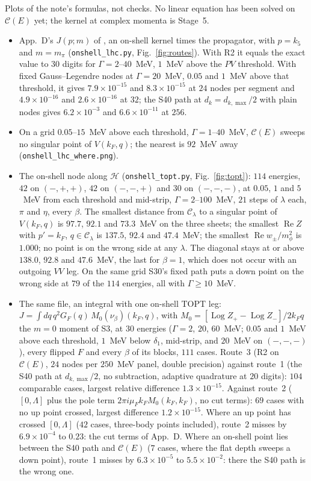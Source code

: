 \documentclass[11pt]{article}
\newcommand{\file}[1]{\nolinkurl{#1}}
\begin{document}
Plots of the note's formulas, not checks. No linear equation has been solved on $\mathcal C(E)$ yet; the kernel at complex momenta is Stage~5.
\begin{itemize}
\item App.~D's $J(p;m)$ of \cite{Wu:2026wxb}, an on-shell kernel times the propagator, with $p=k_5$ and $m=m_\pi$ (\file{onshell_lhc.py}, Fig.~\ref{fig:routes}). With R2 it equals the exact value to 30 digits for $\Gamma=2$--$40$~MeV, $1$~MeV above the $PV$ threshold. With fixed Gauss--Legendre nodes at $\Gamma=20$~MeV, $0.05$ and $1$~MeV above that threshold, it gives $7.9\times10^{-15}$ and $8.3\times10^{-15}$ at $24$ nodes per segment and $4.9\times10^{-16}$ and $2.6\times10^{-16}$ at $32$; the S40 path at $d_k=d_{k,\max}/2$ with plain nodes gives $6.2\times10^{-3}$ and $6.6\times10^{-11}$ at $256$.
\item On a grid $0.05$--$15$~MeV above each threshold, $\Gamma=1$--$40$~MeV, $\mathcal C(E)$ sweeps no singular point of $V(k_F,q)$; the nearest is $92$~MeV away (\file{onshell_lhc_where.png}).
\item The on-shell node along $\mathcal H$ (\file{onshell_topt.py}, Fig.~\ref{fig:topt}): $114$ energies, $42$ on $(-,+,+)$, $42$ on $(-,-,+)$ and $30$ on $(-,-,-)$, at $0.05$, $1$ and $5$~MeV from each threshold and mid-strip, $\Gamma=2$--$100$~MeV, $21$ steps of $\lambda$ each, $\pi$ and $\eta$, every $\beta$. The smallest distance from $\mathcal C_\lambda$ to a singular point of $V(k_F,q)$ is $97.7$, $92.1$ and $73.3$~MeV on the three sheets; the smallest $\operatorname{Re}Z$ with $p'=k_F$, $q\in\mathcal C_\lambda$ is $137.5$, $92.4$ and $47.4$~MeV; the smallest $\operatorname{Re}w_\pm/m_\phi^2$ is $1.000$; no point is on the wrong side at any $\lambda$. The diagonal stays at or above $138.0$, $92.8$ and $47.6$~MeV, the last for $\beta=1$, which does not occur with an outgoing $VV$ leg. On the same grid S30's fixed path puts a down point on the wrong side at $79$ of the $114$ energies, all with $\Gamma\ge10$~MeV.
\item The same file, an integral with one on-shell TOPT leg: $J=\int dq\,q^2G_F(q)\,M_0(\nu_\beta)(k_F,q)$, with $M_0=[\operatorname{Log}Z_+-\operatorname{Log}Z_-]/2k_Fq$ the $m=0$ moment of S3, at $30$ energies ($\Gamma=2$, $20$, $60$~MeV; $0.05$ and $1$~MeV above each threshold, $1$~MeV below $\delta_1$, mid-strip, and $20$~MeV on $(-,-,-)$), every flipped $F$ and every $\beta$ of its blocks, $111$ cases. Route~3 (R2 on $\mathcal C(E)$, $24$ nodes per $250$~MeV panel, double precision) against route~1 (the S40 path at $d_{k,\max}/2$, no subtraction, adaptive quadrature at $20$ digits): $104$ comparable cases, largest relative difference $1.3\times10^{-15}$. Against route~2 ($[0,\Lambda]$ plus the pole term $2\pi i\mu_Fk_FM_0(k_F,k_F)$, no cut terms): $69$ cases with no up point crossed, largest difference $1.2\times10^{-15}$. Where an up point has crossed $[0,\Lambda]$ ($42$ cases, three-body points included), route~2 misses by $6.9\times10^{-4}$ to $0.23$: the cut terms of App.~D. Where an on-shell point lies between the S40 path and $\mathcal C(E)$ ($7$ cases, where the flat depth sweeps a down point), route~1 misses by $6.3\times10^{-5}$ to $5.5\times10^{-2}$: there the S40 path is the wrong one.

\end{itemize}
\end{document}
